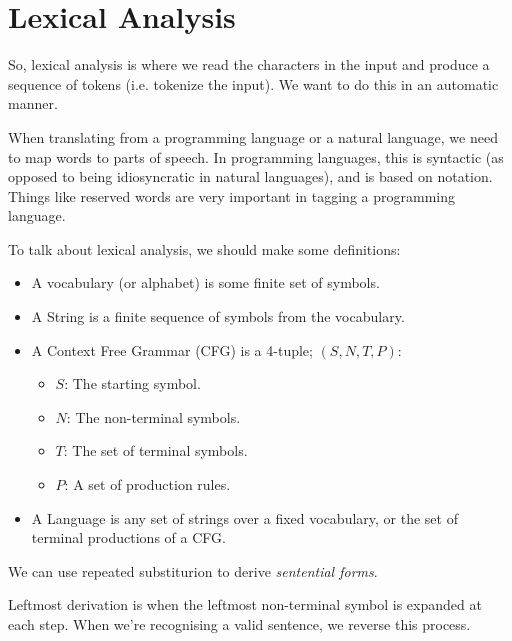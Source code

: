 
\section{Lexical Analysis}

So, lexical analysis is where we read the characters in the input and produce a
sequence of tokens (i.e. tokenize the input). We want to do this in an automatic
manner.

When translating from a programming language or a natural language, we need to
map words to parts of speech. In programming languages, this is syntactic (as
opposed to being idiosyncratic in natural languages), and is based on notation.
Things like reserved words are very important in tagging a programming language.

To talk about lexical analysis, we should make some definitions:


\begin{itemize}
  \item A vocabulary (or alphabet) is some finite set of symbols.
  \item A String is a finite sequence of symbols from the vocabulary.
  \item A Context Free Grammar (CFG) is a 4-tuple; $(S,N,T,P)$:
    \begin{itemize}
      \item $S$: The starting symbol.
      \item $N$: The non-terminal symbols.
      \item $T$: The set of terminal symbols.
      \item $P$: A set of production rules.
    \end{itemize}
  \item A Language is any set of strings over a fixed vocabulary, or the set of
  terminal productions of a CFG. 
\end{itemize}

We can use repeated substiturion to derive \textit{sentential forms}.

Leftmost derivation is when the leftmost non-terminal symbol is expanded at each
step. When we're recognising a valid sentence, we reverse this process.

